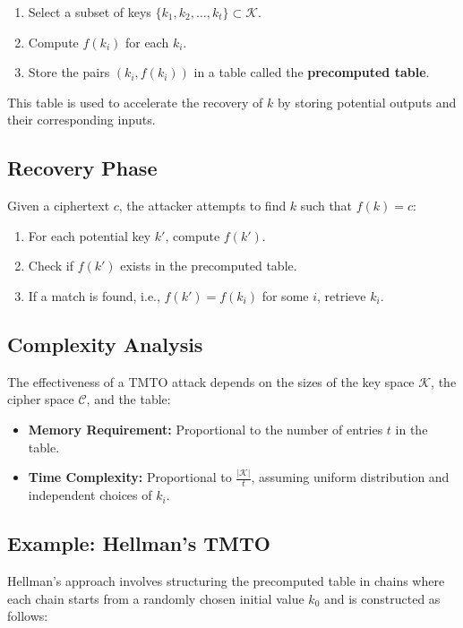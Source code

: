 \begin{enumerate}
	\item Select a subset of keys $\{k_1, k_2, \dots, k_t\} \subset \mathcal{K}$.
	\item Compute $f(k_i)$ for each $k_i$.
	\item Store the pairs $(k_i, f(k_i))$ in a table called the \textbf{precomputed table}.
\end{enumerate}

This table is used to accelerate the recovery of $k$ by storing potential outputs and their corresponding inputs.

\subsection*{Recovery Phase}
Given a ciphertext $c$, the attacker attempts to find $k$ such that $f(k) = c$:

\begin{enumerate}
	\item For each potential key $k'$, compute $f(k')$.
	\item Check if $f(k')$ exists in the precomputed table.
	\item If a match is found, i.e., $f(k') = f(k_i)$ for some $i$, retrieve $k_i$.
\end{enumerate}

\subsection*{Complexity Analysis}
The effectiveness of a TMTO attack depends on the sizes of the key space $\mathcal{K}$, the cipher space $\mathcal{C}$, and the table:

\begin{itemize}
	\item \textbf{Memory Requirement:} Proportional to the number of entries $t$ in the table.
	\item \textbf{Time Complexity:} Proportional to $\frac{|\mathcal{K}|}{t}$, assuming uniform distribution and independent choices of $k_i$.
\end{itemize}

\subsection*{Example: Hellman's TMTO}
Hellman's approach involves structuring the precomputed table in chains where each chain starts from a randomly chosen initial value $k_0$ and is constructed as follows:

